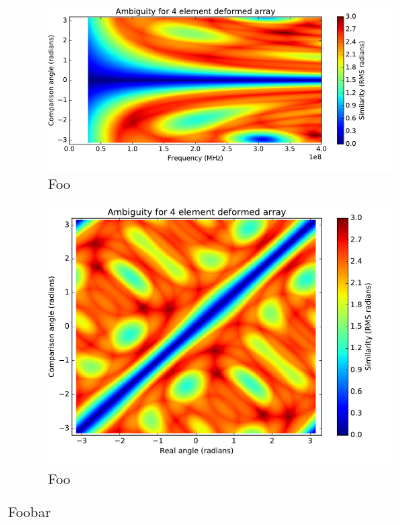 \begin{figure}
  \begin{subfigure}{\textwidth}
    \centering
    \includegraphics[width=\textwidth, clip=true, trim = 0 15 53 0]{4-element-deformed-ambiguity-over-frequency}
    \caption{Foo}
  \end{subfigure}
  \begin{subfigure}{\textwidth}
    \centering
    \includegraphics[width=\textwidth, clip=true, trim = 0 15 53 0]{4-element-deformed-ambiguity-vs-phi}
    \caption{Foo}
  \end{subfigure}
  \caption{Foobar}
\end{figure}

